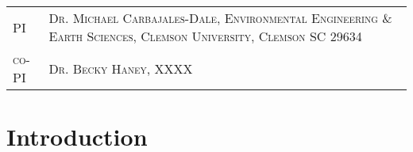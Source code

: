 \documentclass[11pt,a4paper]{article}
\begin{document}

\begin{table}
\begin{tabular}{lp{12cm}}
	\textsc{PI} &			\textsc{Dr. Michael Carbajales-Dale, Environmental Engineering \& Earth Sciences, Clemson University, Clemson SC 29634} \\
	\textsc{co-PI} &	\textsc{Dr. Becky Haney, XXXX}	\\
\end{tabular}
\end{table}
\section{Introduction}
\end{document}
